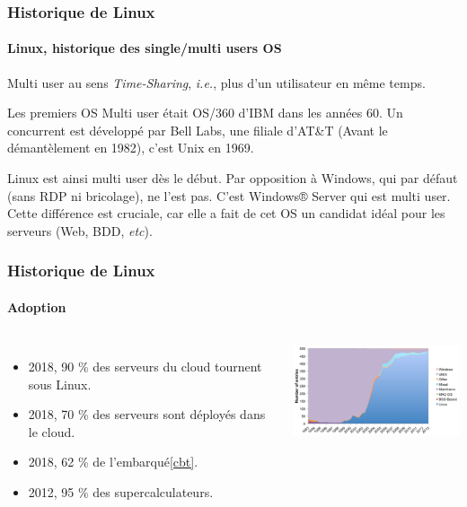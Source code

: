 \documentclass{beamer}
\begin{document}
    \begin{frame}
        \transdissolve
        \frametitle{Historique de Linux}
        \framesubtitle{Linux, historique des single/multi users OS}
        Multi user au sens \textit{Time-Sharing}, \textit{i.e.}, plus d'un utilisateur en même temps.

        Les premiers OS Multi user était OS/360 d'IBM dans les années 60.
        Un concurrent est développé par Bell Labs, une filiale d'AT\&T (Avant le démantèlement en 1982), c'est Unix en 1969.

        Linux est ainsi multi user dès le début.
        Par opposition à Windows, qui par défaut (sans RDP ni bricolage), ne l'est pas.
        C'est Windows® Server qui est multi user.
        \bigbreak
        Cette différence est cruciale, car elle a fait de cet OS un candidat idéal pour les serveurs (Web, BDD, \textit{etc}).
    \end{frame}

    \begin{frame}
        \transdissolve
        \frametitle{Historique de Linux}
        \framesubtitle{Adoption}
        \begin{columns}
            \begin{itemize}
                \item 2018, 90 \% des serveurs du cloud tournent sous Linux\footnotemark.
                \item 2018, 70 \% des serveurs sont déployés dans le cloud\footnotemark.
                \item 2018, 62 \% de l'embarqué\cref{cbt}.
                \item 2012, 95 \% des supercalculateurs\footnotemark.
            \end{itemize}
            \centering
            \includegraphics[width=6cm]{image/linux-supercomputer-growth}
        \end{columns}
    \end{frame}
\end{document}
